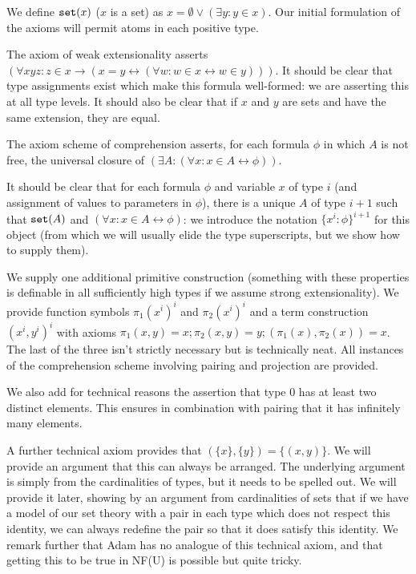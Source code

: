 \documentclass[12pt]{article}
\begin{document}
We define ${\tt set}(x)$ ($x$ is a set) as $x = \emptyset \vee (\exists y:y \in x)$.  Our initial formulation of the axioms will permit atoms in each positive type.

The axiom of weak extensionality asserts $(\forall xyz:z \in x \rightarrow (x=y \leftrightarrow (\forall w:w \in x \leftrightarrow w \in y)))$.  It should be clear that type assignments
exist which make this formula well-formed:  we are asserting this at all type levels.  It should also be clear that if $x$ and $y$ are sets and have the same extension, they are equal.

The axiom scheme of comprehension asserts, for each formula $\phi$ in which $A$ is not free, the universal closure of $(\exists A:(\forall x:x \in A \leftrightarrow \phi))$.

It should be clear that for each formula $\phi$ and variable $x$ of type $i$ (and assignment of values to parameters in $\phi$), there is a unique $A$ of type $i+1$ such that ${\tt set}(A)$ and
$(\forall x:x \in A \leftrightarrow \phi)$:  we introduce the notation $\{x^i:\phi\}^{i+1}$ for this object (from which we will usually elide the type superscripts, but we show how to supply them).

We supply one additional primitive construction (something with these properties is definable in all sufficiently high types if we assume strong extensionality).  We provide function symbols
$\pi_1(x^i)^{i}$ and $\pi_2(x^i)^{i}$ and a term construction $(x^i,y^i)^{i}$ with axioms $\pi_1(x,y) = x; \pi_2(x,y)=y; (\pi_1(x),\pi_2(x))=x$.  The last of the three isn't strictly necessary but is technically neat.  All instances of the comprehension scheme involving pairing and projection are provided.

We also add for technical reasons the assertion that type 0 has at least two distinct elements.  This ensures in combination with pairing that it has infinitely many elements.

A further technical axiom provides that $(\{x\},\{y\}) = \{(x,y)\}$.  We will provide an argument that this can always be arranged.   The underlying argument is simply from the cardinalities of types, but it needs to be spelled out.  We will provide it later, showing by an argument from cardinalities of sets that if we have a model of our set theory with a pair in each type which does not respect this identity, we can always redefine the pair so that it does satisfy this identity.  We remark further that Adam has no analogue of this technical axiom, and that getting this to be true in NF(U) is possible but quite tricky.
\end{document}
